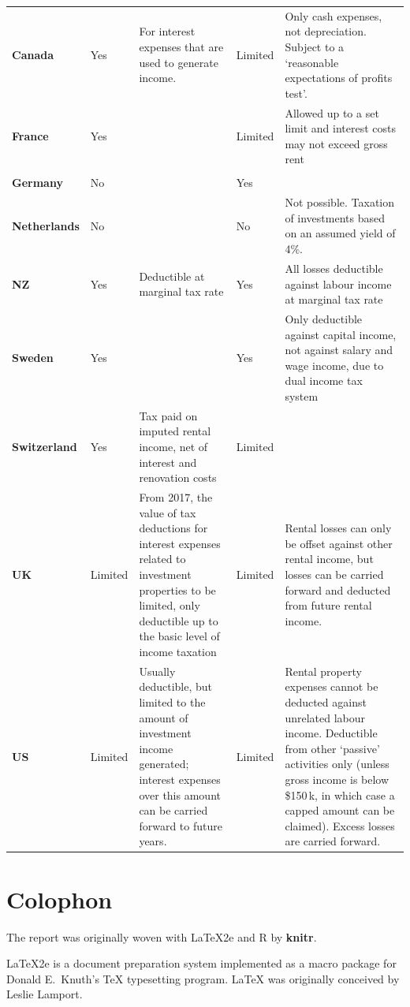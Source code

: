 \begin{subappendices}
\begin{longtable}[r]{>{\footnotesize\bfseries}l@{}>{\footnotesize\raggedleft}p{1.75cm}>{\footnotesize\raggedright}p{3.00cm}>{\footnotesize\raggedleft}p{1.95cm}>{\footnotesize\raggedright\arraybackslash}p{3.22cm}}
    Canada & Yes   & For interest expenses that are used to generate income. & Limited & Only cash expenses, not depreciation. Subject to a ‘reasonable expectations of profits test’. \\
    {France} & {Yes} &  & {Limited} & {Allowed up to a set limit and interest costs may not exceed gross rent} \\
          &       &       &       &  \\
    Germany & No    &       & Yes   &  \\
    Netherlands & No    &       & No    & Not possible. Taxation of investments based on an assumed yield of 4\%. \\
    NZ & Yes   & Deductible at marginal tax rate & Yes   & All losses deductible against labour income at marginal tax rate \\
    Sweden & Yes   &       & Yes   & Only deductible against capital income, not against salary and wage income, due to dual income tax system \\
    Switzerland & Yes   & Tax paid on imputed rental income, net of interest and renovation costs & Limited &  \\
    UK & Limited & From 2017, the value of tax deductions for interest expenses related to investment properties to be limited, only deductible up to the basic level of income taxation & Limited & Rental losses can only be offset against other rental income, but losses can be carried forward and deducted from future rental income. \\
    US & Limited & Usually deductible, but limited to the amount of investment income generated; interest expenses over this amount can be carried forward to future years. & Limited & Rental property expenses cannot be deducted against unrelated labour income. Deductible from other ‘passive’ activities only (unless gross income is below \$150\,k, in which case a capped amount can be claimed). Excess losses are carried forward. \\
\end{longtable}


\FloatBarrier
\chapter{Colophon}
The report was originally woven with \LaTeX2e and R by \textbf{knitr}. 

\LaTeX2e{} is a document preparation system implemented as a macro package for Donald E.\ Knuth's \TeX{} typesetting program. \LaTeX{} was originally conceived by Leslie Lamport. 


\end{subappendices}
